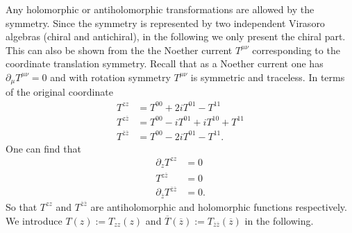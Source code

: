 \documentclass[submission, PhysLectNotes]{SciPost}
\begin{document}
Any holomorphic or antiholomorphic transformations are allowed by the symmetry. Since the symmetry is represented by two independent Virasoro algebras (chiral and antichiral), in the following we only present the chiral part. This can also be shown from the the Noether current $T^{\mu\nu}$ corresponding to the coordinate translation symmetry. Recall that as a Noether current one has $\partial_\mu T^{\mu\nu} = 0$ and with rotation symmetry $T^{\mu\nu}$ is symmetric and traceless. In terms of the original coordinate
\begin{equation}
	\begin{aligned}
		T^{zz} &= T^{00} + 2iT^{01} - T^{11} \\
		T^{z\overline{z}} &= T^{00} - iT^{01} + iT^{10} + T^{11} \\
		T^{\overline{z}\overline{z}} &= T^{00} - 2iT^{01} - T^{11}.
	\end{aligned}
\end{equation}
One can find that 
\begin{equation}
	\begin{aligned}
		\partial_z T^{zz} &= 0 \\
		T^{z\overline{z}} &= 0 \\
		\partial_{\overline{z}} T^{\overline{z}\overline{z}} &= 0.
	\end{aligned}
\end{equation}
So that $T^{zz}$ and $T^{\overline{z}\overline{z}}$ are antiholomorphic and holomorphic functions respectively. We introduce $T(z) := T_{zz}(z)$ and $\overline{T}(\overline{z}) := T_{\overline{z}\overline{z}}(\overline{z})$ in the following. 






\end{document}
